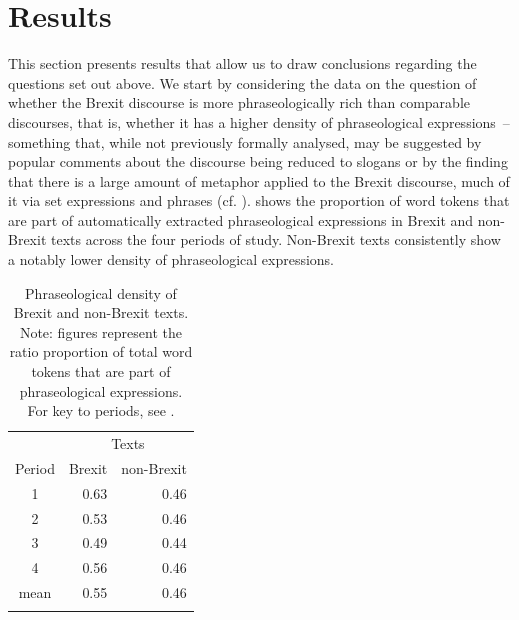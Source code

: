 \documentclass[output=paper]{langscibook}
\begin{document}
\section{Results}

This section presents results that allow us to draw conclusions regarding the questions set out above. We start by considering the data on the question of whether the Brexit discourse is more phraseologically rich than comparable discourses, that is, whether it has a higher density of phraseological expressions~-- something that, while not previously formally analysed, may be suggested by popular comments about the discourse being reduced to slogans or by the finding that there is a large amount of metaphor applied to the Brexit discourse, much of it via set expressions and phrases (cf. \citealt[2]{Charteris-Black2019}).  shows the proportion of word tokens that are part of automatically extracted phraseological expressions in Brexit and non-Brexit texts across the four periods of study. Non-Brexit texts consistently show a notably lower density of phraseological expressions.


\begin{table}
\begin{tabular}{crr}
\lsptoprule
       & \multicolumn{2}{c}{Texts}\\\cmidrule(lr){2-3}
Period & Brexit & non-Brexit\\\midrule
1    & 0.63 & 0.46\\
2    & 0.53 & 0.46\\
3    & 0.49 & 0.44\\
4    & 0.56 & 0.46\\
mean & 0.55 & 0.46\\
\lspbottomrule
\end{tabular}
\caption{Phraseological density of Brexit and non-Brexit texts. Note: figures represent the ratio proportion of total word tokens that are part of phraseological expressions. For key to periods, see .}
\label{tab:2}
\end{table}
\end{document}
